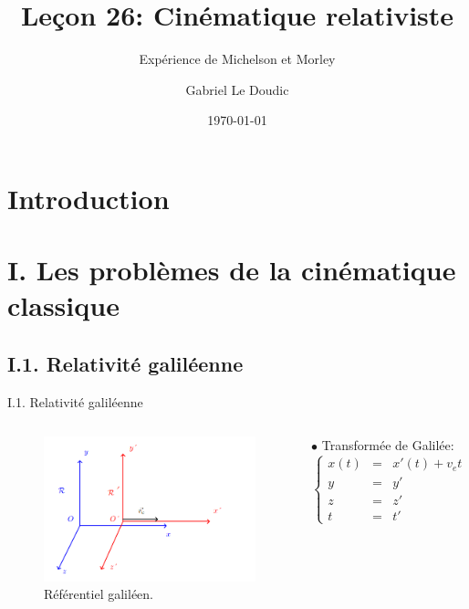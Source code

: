 \documentclass{beamer}
\title{Leçon 26: Cinématique relativiste}
\subtitle{Expérience de Michelson et Morley}
\author{Gabriel Le Doudic}
\date{\today}
\institute{Préparation à l'agrégation de Rennes 1}
\begin{document}
\maketitle
\section{Introduction}


\section{I. Les problèmes de la cinématique classique}
\subsection{I.1. Relativité galiléenne}
\begin{frame}{I.1. Relativité galiléenne}
    \begin{columns}
    \begin{block}{}
\begin{figure}
    \centering
    \includegraphics[width=1\textwidth]{refgalileen.png}
    \caption{Référentiel galiléen.}
\end{figure}
\end{block}
$\bullet$ Transformée de Galilée:
\begin{equation}
    \left\{\begin{array} {rcl}
        x(t) &=& x'(t) + v_e t\\
        y &=& y'\\
        z &=& z'\\
        t &=& t'\nonumber
    \end{array}\right.
\end{equation}
\end{columns}
\end{frame}
\end{document}
